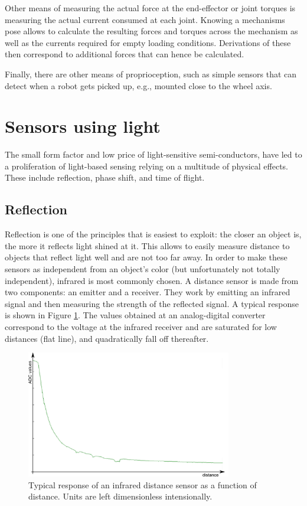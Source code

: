 Other means of measuring the actual force at the end-effector or joint torques is measuring the actual current consumed at each joint. Knowing a mechanisms pose allows to calculate the resulting forces and torques across the mechanism as well as the currents required for empty loading conditions. Derivations of these then correspond to additional forces that can hence be calculated.

Finally, there are other means of proprioception, such as simple sensors that can detect when a robot gets picked up, e.g., mounted close to the wheel axis.
 
\section{Sensors using light}
The small form factor and low price of light-sensitive semi-conductors, have led to a proliferation of light-based sensing relying on a multitude of physical effects. These include reflection, phase shift, and time of flight.

\subsection{Reflection}
Reflection is one of the principles that is easiest to exploit: the closer an object is, the more it reflects light shined at it. This allows to easily measure distance to objects that reflect light well and are not too far away. In order to make these sensors as independent from an object's color (but unfortunately not totally independent), infrared is most commonly chosen. A distance sensor is made from two components: an emitter and a receiver. They work by emitting an infrared signal and then measuring the strength of the reflected signal. A typical response is shown in Figure \ref{fig:epuckir}. The values obtained at an analog-digital converter correspond to the voltage at the infrared receiver and are saturated for low distances (flat line), and quadratically fall off thereafter.

\begin{figure}
	\centering
		\includegraphics[width=0.8\textwidth]{figs/epuckirsensor.png}
	\caption{Typical response of an infrared distance sensor as a function of distance. Units are left dimensionless intensionally.}
	\label{fig:epuckir}
\end{figure}

